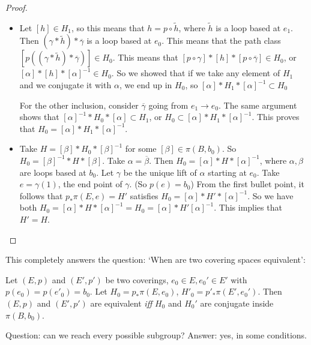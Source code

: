\begin{proof}
    \begin{itemize}
        \item Let $[h] \in H_1$, so this means that $h = p  \circ \tilde{h}$, where $\tilde{h}$ is a loop based at $e_1$.
            Then $(\gamma*\tilde{h})* \overline{\gamma}$ is a loop based at $e_0$.
            This means that the path class $[p((\gamma  * \tilde{h} )*\overline{\gamma})] \in H_0$.
            This means that $[p  \circ  \gamma] * [h] * [p  \circ  \overline{\gamma}] \in H_0$, or $[\alpha] * [h] * [\alpha]^{-1} \in H_0$.
            So we showed that if we take any element of $H_1$ and we conjugate it with $\alpha$, we end up in $H_0$, so $[\alpha] * H_1 * [\alpha]^{-1} \subset H_0$

            For the other inclusion, consider $\overline{\gamma}$ going from $e_1 \to  e_0$.
            The same argument shows that $[\alpha] ^{-1} * H_0 * [\alpha] \subset H_1$,
            or $H_0 \subset [\alpha] * H_1 * [\alpha]^{-1}$.
            This proves that $H_0 = [\alpha] * H_1 * [\alpha]^{-1}$.
        \item Take $H = [\beta] * H_0 * [\beta]^{-1}$ for some $[\beta] \in  \pi(B,b_0)$.
            So $H_0 = [\beta]^{-1} * H * [\beta]$. Take $\alpha = \overline{\beta}$.
            Then $H_0 = [\alpha] * H * [\alpha]^{-1}$, where $\alpha, \beta$ are loops based at $b_0$.
            Let $\gamma$ be the unique lift of $\alpha$ starting at $e_0$.
            Take $e = \gamma(1)$, the end point of $\gamma$. (So $p(e) = b_0$)
            From  the first bullet point, it follows that $p_* \pi(E,e) = H'$ satisfies $H_0 = [\alpha] * H' * [\alpha]^{-1}$.
            So we have both $H_0 = [\alpha] * H * [\alpha]^{-1} = H_0 = [\alpha] * H' [\alpha]^{-1}$. This implies that $H' = H$.
    \end{itemize}
\end{proof}

This completely answers the question: `When are two covering spaces equivalent':

\begin{corollary}[Theorem 74.4]
    Let $(E, p)$ and $(E', p')$ be two coverings, $e_0 \in E, e_0' \in E'$ with $p(e_0) = p(e'_0) = b_0$.
    Let $H_0 = p_* \pi(E,e_0)$, $H'_0 = p'_* \pi(E',e_0') $.
    Then $(E, p)$ and $(E', p')$ are equivalent \emph{iff} $H_0$ and $H_0'$ are conjugate inside $\pi(B,b_0) $.
\end{corollary}


Question: can we reach every possible subgroup? Answer: yes, in some conditions.

